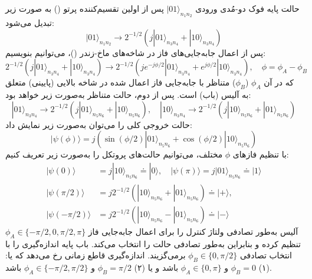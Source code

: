 حالت پایه فوک دو-مُدی ورودی $|01\rangle_{n_1 n_2}$ پس از اولین تقسیم‌کننده پرتو () به صورت زیر تبدیل می‌شود:
\begin{equation}
	|01\rangle_{n_1 n_2} \rightarrow 2^{-1/2}(j|01\rangle_{n_3 n_4} + |10\rangle_{n_3 n_4})
	\label{eq:7-16}
\end{equation}
پس از اعمال جابه‌جایی‌های فاز در شاخه‌های ماخ-زندر ()، می‌توانیم بنویسیم:
\begin{equation}
	2^{-1/2}(j|01\rangle_{n_3 n_4} + |10\rangle_{n_3 n_4}) \rightarrow 2^{-1/2}(je^{-j\phi/2}|01\rangle_{n_3 n_4} + e^{j\phi/2}|10\rangle_{n_3 n_4}), \quad \phi = \phi_A - \phi_B
	\label{eq:7-17}
\end{equation}
که در آن $\phi_A$ ($\phi_B$) متناظر با جابه‌جایی فاز اعمال شده در شاخه بالایی (پایینی) متعلق به آلیس (باب) است. پس از  دوم، حالت متناظر به‌صورت زیر خواهد بود:
\begin{equation}
	|01\rangle_{n_3 n_4} \rightarrow 2^{-1/2}(j|01\rangle_{n_5 n_6} + |10\rangle_{n_5 n_6}), \quad |10\rangle_{n_3 n_4} \rightarrow 2^{-1/2}(j|10\rangle_{n_5 n_6} + |01\rangle_{n_5 n_6})
	\label{eq:7-18}
\end{equation}
حالت خروجی کلی را می‌توان به‌صورت زیر نمایش داد:
\begin{equation}
	|\psi(\phi)\rangle = j(\sin(\phi/2)|01\rangle_{n_5 n_6} + \cos(\phi/2)|10\rangle_{n_5 n_6})
	\label{eq:7-19}
\end{equation}
با تنظیم فازهای $\phi$ مختلف، می‌توانیم حالت‌های پروتکل  را به‌صورت زیر تعریف کنیم:
\begin{equation}
	\begin{aligned}
		|\psi(0)\rangle &= j|10\rangle_{n_5 n_6} \doteq |0\rangle, \quad |\psi(\pi)\rangle = j|01\rangle_{n_5 n_6} \doteq |1\rangle \\
		|\psi(\pi/2)\rangle &= j2^{-1/2}(|10\rangle_{n_5 n_6} + |01\rangle_{n_5 n_6}) \doteq |+\rangle, \\
		|\psi(-\pi/2)\rangle &= j2^{-1/2}(|10\rangle_{n_5 n_6} - |01\rangle_{n_5 n_6}) \doteq |-\rangle
	\end{aligned}
	\label{eq:7-20}
\end{equation}
آلیس به‌طور تصادفی ولتاژ کنترل را برای اعمال جابه‌جایی فاز $\phi_A \in \{-\pi/2, 0, \pi/2, \pi\}$ تنظیم کرده و بنابراین به‌طور تصادفی حالت را انتخاب می‌کند. باب پایه اندازه‌گیری را با انتخاب تصادفی $\phi_B \in \{0, \pi/2\}$ برمی‌گزیند. اندازه‌گیری قاطع زمانی رخ می‌دهد که یا: (۱) $\phi_B = 0$ و $\phi_A \in \{0, \pi\}$ باشد و یا (۲) $\phi_B = \pi/2$ و $\phi_A \in \{-\pi/2, \pi/2\}$ باشد.













